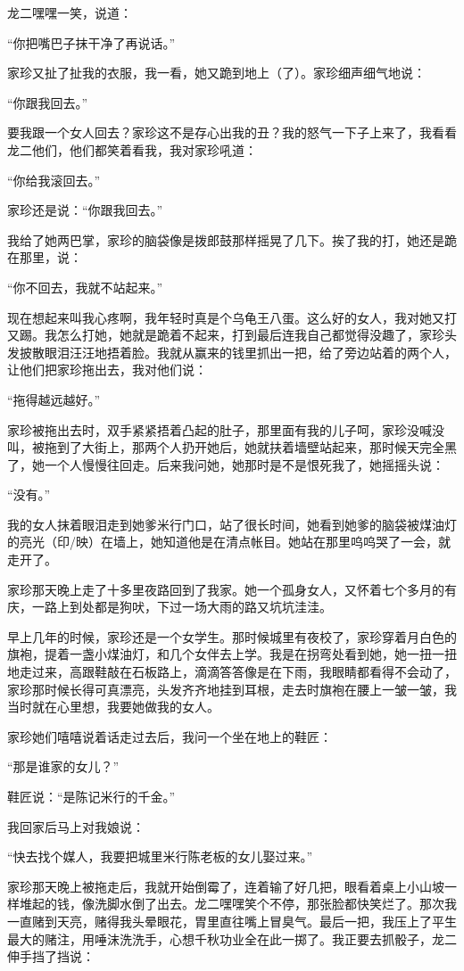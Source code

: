 \documentclass[12pt,UTF8]{ctexbook}
\begin{document}
龙二嘿嘿一笑，说道：

“你把嘴巴子抹干净了再说话。”

家珍又扯了扯我的衣服，我一看，她又跪到地上（了）。家珍细声细气地说：

“你跟我回去。”

要我跟一个女人回去？家珍这不是存心出我的丑？我的怒气一下子上来了，我看看龙二他们，他们都笑着看我，我对家珍吼道：

“你给我滚回去。”

家珍还是说：“你跟我回去。”

我给了她两巴掌，家珍的脑袋像是拨郎鼓那样摇晃了几下。挨了我的打，她还是跪在那里，说：

“你不回去，我就不站起来。”

现在想起来叫我心疼啊，我年轻时真是个乌龟王八蛋。这么好的女人，我对她又打又踢。我怎么打她，她就是跪着不起来，打到最后连我自己都觉得没趣了，家珍头发披散眼泪汪汪地捂着脸。我就从赢来的钱里抓出一把，给了旁边站着的两个人，让他们把家珍拖出去，我对他们说：

“拖得越远越好。”

家珍被拖出去时，双手紧紧捂着凸起的肚子，那里面有我的儿子呵，家珍没喊没叫，被拖到了大街上，那两个人扔开她后，她就扶着墙壁站起来，那时候天完全黑了，她一个人慢慢往回走。后来我问她，她那时是不是恨死我了，她摇摇头说：

“没有。”

我的女人抹着眼泪走到她爹米行门口，站了很长时间，她看到她爹的脑袋被煤油灯的亮光（印/映）在墙上，她知道他是在清点帐目。她站在那里呜呜哭了一会，就走开了。

家珍那天晚上走了十多里夜路回到了我家。她一个孤身女人，又怀着七个多月的有庆，一路上到处都是狗吠，下过一场大雨的路又坑坑洼洼。

早上几年的时候，家珍还是一个女学生。那时候城里有夜校了，家珍穿着月白色的旗袍，提着一盏小煤油灯，和几个女伴去上学。我是在拐弯处看到她，她一扭一扭地走过来，高跟鞋敲在石板路上，滴滴答答像是在下雨，我眼睛都看得不会动了，家珍那时候长得可真漂亮，头发齐齐地挂到耳根，走去时旗袍在腰上一皱一皱，我当时就在心里想，我要她做我的女人。

家珍她们嘻嘻说着话走过去后，我问一个坐在地上的鞋匠：

“那是谁家的女儿？”

鞋匠说：“是陈记米行的千金。”

我回家后马上对我娘说：

“快去找个媒人，我要把城里米行陈老板的女儿娶过来。”

家珍那天晚上被拖走后，我就开始倒霉了，连着输了好几把，眼看着桌上小山坡一样堆起的钱，像洗脚水倒了出去。龙二嘿嘿笑个不停，那张脸都快笑烂了。那次我一直赌到天亮，赌得我头晕眼花，胃里直往嘴上冒臭气。最后一把，我压上了平生最大的赌注，用唾沫洗洗手，心想千秋功业全在此一掷了。我正要去抓骰子，龙二伸手挡了挡说：
\end{document}
